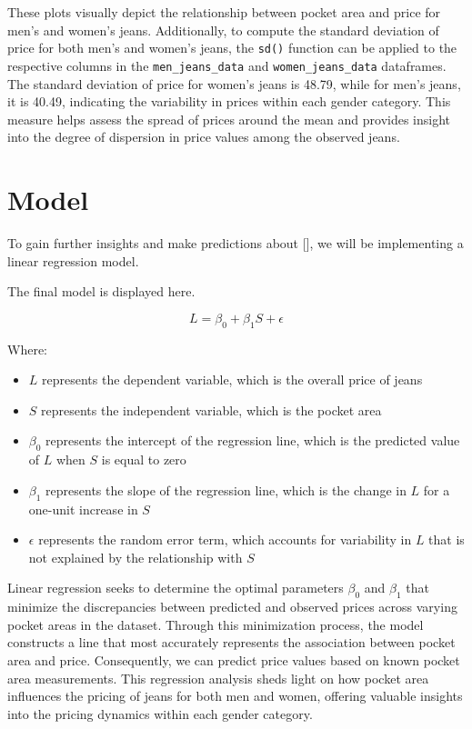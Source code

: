 \documentclass[
  letterpaper,
  DIV=11,
  numbers=noendperiod]{scrartcl}
\providecommand{\tightlist}{%
  \setlength{\itemsep}{0pt}\setlength{\parskip}{0pt}}\usepackage{longtable,booktabs,array}
\begin{document}
These plots visually depict the relationship between pocket area and
price for men's and women's jeans. Additionally, to compute the standard
deviation of price for both men's and women's jeans, the \texttt{sd()}
function can be applied to the respective columns in the
\texttt{men\_jeans\_data} and \texttt{women\_jeans\_data} dataframes.
The standard deviation of price for women's jeans is 48.79, while for
men's jeans, it is 40.49, indicating the variability in prices within
each gender category. This measure helps assess the spread of prices
around the mean and provides insight into the degree of dispersion in
price values among the observed jeans.

\hypertarget{model}{%
\section{Model}\label{model}}

To gain further insights and make predictions about {[}{]}, we will be
implementing a linear regression model.

The final model is displayed here.

\[L = \beta_0 + \beta_1S + \epsilon\]

Where:

\begin{itemize}
\tightlist
\item
  \(L\) represents the dependent variable, which is the overall price of
  jeans
\item
  \(S\) represents the independent variable, which is the pocket area
\item
  \(\beta_0\) represents the intercept of the regression line, which is
  the predicted value of \(L\) when \(S\) is equal to zero
\item
  \(\beta_1\) represents the slope of the regression line, which is the
  change in \(L\) for a one-unit increase in \(S\)
\item
  \(\epsilon\) represents the random error term, which accounts for
  variability in \(L\) that is not explained by the relationship with
  \(S\)
\end{itemize}

Linear regression seeks to determine the optimal parameters \(\beta_0\)
and \(\beta_1\) that minimize the discrepancies between predicted and
observed prices across varying pocket areas in the dataset. Through this
minimization process, the model constructs a line that most accurately
represents the association between pocket area and price. Consequently,
we can predict price values based on known pocket area measurements.
This regression analysis sheds light on how pocket area influences the
pricing of jeans for both men and women, offering valuable insights into
the pricing dynamics within each gender category.
\end{document}
